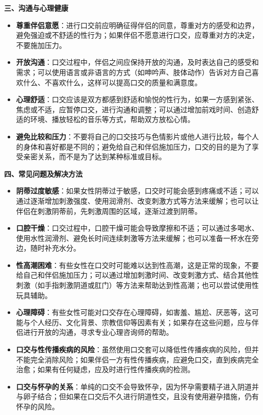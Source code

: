 \documentclass[12pt,UTF8]{ctexbook}
\begin{document}
  \textbf{三、沟通与心理健康}
  \begin{itemize}
  \item \textbf{尊重伴侣意愿}：进行口交前应明确征得伴侣的同意，尊重对方的感受和边界，避免强迫或不舒适的性行为；如果伴侣不愿意进行口交，应尊重对方的决定，不要施加压力。
  \item \textbf{开放沟通}：口交过程中，伴侣之间应保持开放的沟通，及时表达自己的感受和需求；可以使用语言或非语言的方式（如呻吟声、肢体动作）告诉对方自己喜欢什么、不喜欢什么，这样可以提高口交的质量和满意度。
  \item \textbf{心理舒适}：口交应该是双方都感到舒适和愉悦的性行为，如果一方感到紧张、焦虑或不适，应暂停口交，进行沟通和调整；可以通过增加前戏时间、创造舒适的环境、播放轻松的音乐等方式，帮助双方放松心情。
  \item \textbf{避免比较和压力}：不要将自己的口交技巧与色情影片或他人进行比较，每个人的身体和喜好都是不同的；避免给自己和伴侣施加压力，口交的目的是为了享受亲密关系，而不是为了达到某种标准或目标。
  \end{itemize}

  \textbf{四、常见问题及解决方法}
  \begin{itemize}
  \item \textbf{阴蒂过度敏感}：如果女性阴蒂过于敏感，口交时可能会感到疼痛或不适；可以通过逐渐增加刺激强度、使用润滑剂、改变刺激方式等方法来缓解；也可以让伴侣在刺激阴蒂前，先刺激周围的区域，逐渐过渡到阴蒂。
  \item \textbf{口腔干燥}：口交过程中，口腔干燥可能会导致摩擦和不适；可以通过多喝水、使用水性润滑剂、避免长时间连续刺激等方法来缓解；也可以准备一杯水在旁边，随时补充水分。
  \item \textbf{性高潮困难}：有些女性在口交时可能难以达到性高潮，这是正常的现象，不要给自己和伴侣施加压力；可以通过增加刺激时间、改变刺激方式、结合其他性刺激（如手指刺激阴道或肛门）等方法来帮助达到性高潮；也可以尝试使用性玩具辅助。
  \item \textbf{心理障碍}：有些女性可能对口交存在心理障碍，如害羞、尴尬、厌恶等，这可能与个人经历、文化背景、宗教信仰等因素有关；如果存在这些问题，应与伴侣进行开放的沟通，寻求专业心理咨询师的帮助。
  \item \textbf{口交与性传播疾病的风险}：虽然使用口交套可以降低性传播疾病的风险，但并不能完全消除风险；如果伴侣一方有性传播疾病，应避免口交，直到疾病完全治愈；如果有任何疑虑，应及时进行性传播疾病的检测。
  \item \textbf{口交与怀孕的关系}：单纯的口交不会导致怀孕，因为怀孕需要精子进入阴道并与卵子结合；但如果在口交后不久进行阴道性交，且没有使用避孕措施，仍有怀孕的风险。
  \end{itemize}
\end{document}
